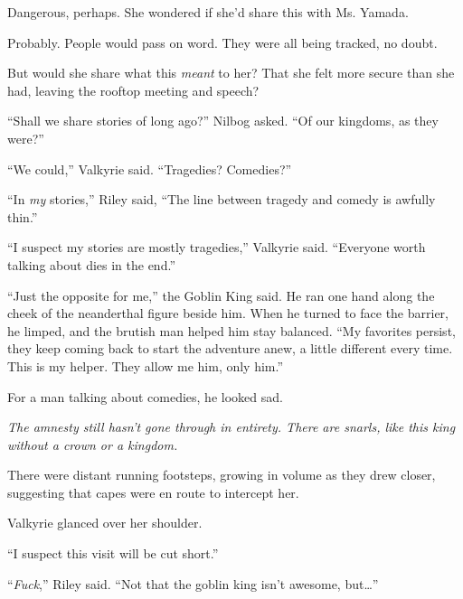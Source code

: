 Dangerous, perhaps.  She wondered if she'd share this with Ms. Yamada.



Probably.  People would pass on word.  They were all being tracked, no doubt.



But would she share what this \emph{meant} to her?  That she felt more secure than she had, leaving the rooftop meeting and speech?



``Shall we share stories of long ago?''  Nilbog asked.  ``Of our kingdoms, as they were?''



``We could,'' Valkyrie said.  ``Tragedies?  Comedies?''



``In \emph{my} stories,'' Riley said, ``The line between tragedy and comedy is awfully thin.''



``I suspect my stories are mostly tragedies,'' Valkyrie said.  ``Everyone worth talking about dies in the end.''



``Just the opposite for me,'' the Goblin King said.  He ran one hand along the cheek of the neanderthal figure beside him.  When he turned to face the barrier, he limped, and the brutish man helped him stay balanced.  ``My favorites persist, they keep coming back to start the adventure anew, a little different every time.  This is my helper.  They allow me him, only him.''



For a man talking about comedies, he looked sad.



\emph{The amnesty still hasn't gone through in entirety.  There are snarls, like this king without a crown or a kingdom.}



There were distant running footsteps, growing in volume as they drew closer, suggesting that capes were en route to intercept her.



Valkyrie glanced over her shoulder.



``I suspect this visit will be cut short.''



``\emph{Fuck},'' Riley said.  ``Not that the goblin king isn't awesome, but\ldots''



